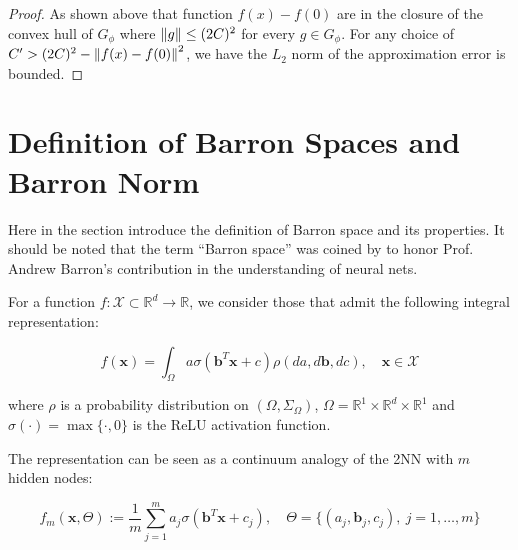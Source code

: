 \begin{proof}
As shown above that function $f(x) - f(0)$ are in the closure of the convex hull of $G_{\phi}$ where
$\left\| g \right\| \leq (2C)^2$ for every $g \in G_{\phi}$. 
For any choice of $C' > (2C)^2 - \left\| f(x) - f(0) \right\|^2$,
we have the $L_2$ norm of the approximation error is bounded.




\end{proof}

\newpage

\section{Definition of Barron Spaces and Barron Norm}

Here in the section introduce the definition of Barron space and its properties. It should be noted that the term ``Barron space'' was coined
by \cite{ePrioriEstimatesPopulation2019} to honor Prof. Andrew Barron's
contribution in the understanding of neural nets.

For a function $f: \mathcal{X} \subset \mathbb{R}^d \to \mathbb{R}$, we consider those that admit the following integral representation:

\begin{equation}\label{eq:barron_represent}
    f(\mathbf{x}) = \int_{\Omega} a \sigma(\mathbf{b}^T\mathbf{x} + c) \rho(da, d\mathbf{b}, dc), \quad \mathbf{x} \in \mathcal{X} 
\end{equation}

where $\rho$ is a probability distribution on $(\Omega, \Sigma_\Omega)$, $\Omega = \mathbb{R}^1 \times \mathbb{R}^d \times \mathbb{R}^1$ and $\sigma(\cdot) = \max\{\cdot, 0\}$ is the ReLU activation function.

The representation can be seen as a continuum analogy of the 2NN with $m$ hidden nodes:

\begin{equation}
    f_m(\mathbf{x}, \Theta) := \frac{1}{m} \sum_{j=1}^m a_j \sigma(\mathbf{b}^T\mathbf{x} + c_j), \quad \Theta = \{(a_j, \mathbf{b}_j, c_j), \ j = 1, \dots, m\}
\end{equation}

